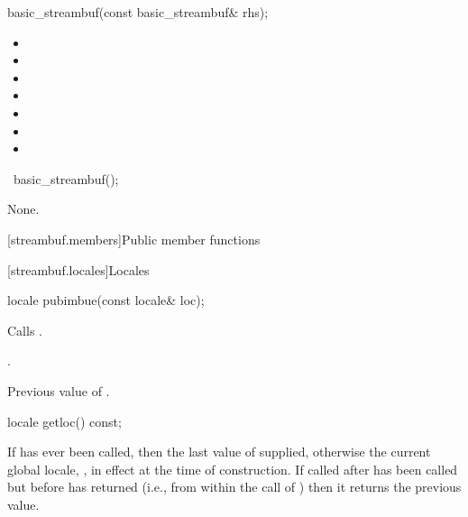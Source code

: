 %
\begin{itemdecl}
basic_streambuf(const basic_streambuf& rhs);
\end{itemdecl}

\begin{itemdescr}
\pnum
\ensures
\begin{itemize}
\item {}
\item {}
\item {}
\item {}
\item {}
\item {}
\item {}
\end{itemize}
\end{itemdescr}

%
\begin{itemdecl}
~basic_streambuf();
\end{itemdecl}

\begin{itemdescr}
\pnum
\effects
None.
\end{itemdescr}

[streambuf.members]{Public member functions}

[streambuf.locales]{Locales}

%
\begin{itemdecl}
locale pubimbue(const locale& loc);
\end{itemdecl}

\begin{itemdescr}
\pnum
\effects
Calls
.

\pnum
\ensures
{}.

\pnum
\returns
Previous value of
.
\end{itemdescr}

%
\begin{itemdecl}
locale getloc() const;
\end{itemdecl}

\begin{itemdescr}
\pnum
\returns
If
has ever been called, then the last value of  supplied,
otherwise the current global locale,
,
in effect at the time of construction.
If called after
has been called but before
has returned (i.e., from within the call of
)
then it returns the previous value.
\end{itemdescr}

